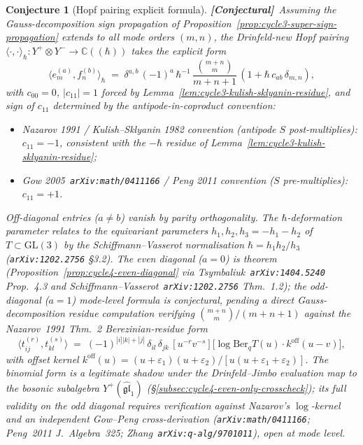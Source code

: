 \documentclass[11pt]{amsart}
\newtheorem{conjecture}[theorem]{Conjecture}
\theoremstyle{definition}
\providecommand{\bC}{\mathbb{C}}
\providecommand{\fgl}{\mathfrak{gl}}
\providecommand{\ClaimStatusConjectured}{\textbf{\textsf{[Conjectural]}}}
\begin{document}
\begin{conjecture}[Hopf pairing explicit formula]
\label{conj:hopf-pairing}
\ClaimStatusConjectured\
Assuming the Gauss-decomposition sign propagation of
Proposition~\ref{prop:cycle3-super-sign-propagation} extends to all mode
orders $(m, n)$, the Drinfeld-new Hopf pairing
$\langle \cdot, \cdot \rangle_\hbar : Y^+ \otimes Y^- \to \bC((\hbar))$
takes the explicit form
\begin{equation}\label{eq:hopf-pairing-formula}
  \langle e^{(a)}_m, f^{(b)}_n \rangle_\hbar
  \;=\; \delta^{a,b}\, (-1)^a\, \hbar^{-1}\,
    \frac{\binom{m+n}{m}}{m+n+1}\,
    (1 + \hbar\, c_{ab}\, \delta_{m,n}),
\end{equation}
with $c_{00} = 0$, $|c_{11}| = 1$ forced by
Lemma~\ref{lem:cycle3-kulish-sklyanin-residue}, and sign of $c_{11}$
determined by the antipode-in-coproduct convention:
\begin{itemize}[leftmargin=2em]
\item \emph{Nazarov 1991 / Kulish--Sklyanin 1982 convention} (antipode
  $S$ post-multiplies): $c_{11} = -1$, consistent with the $-\hbar$
  residue of Lemma~\ref{lem:cycle3-kulish-sklyanin-residue};
\item \emph{Gow 2005~\texttt{arXiv:math/0411166} / Peng 2011 convention}
  ($S$ pre-multiplies): $c_{11} = +1$.
\end{itemize}
Off-diagonal entries ($a \neq b$) vanish by parity orthogonality. The
$\hbar$-deformation parameter relates to the equivariant parameters
$h_1, h_2, h_3 = -h_1 - h_2$ of $T\subset\mathrm{GL}(3)$ by the
Schiffmann--Vasserot normalisation $\hbar = h_1 h_2 / h_3$
(\texttt{arXiv:1202.2756} \S3.2). The even diagonal ($a = 0$) is theorem
(Proposition~\ref{prop:cycle4-even-diagonal} via
Tsymbaliuk~\texttt{arXiv:1404.5240} Prop.~4.3 and
Schiffmann--Vasserot~\texttt{arXiv:1202.2756} Thm.~1.2); the odd-diagonal
($a = 1$) mode-level formula is conjectural, pending a direct
Gauss-decomposition residue computation verifying $\binom{m+n}{m}/(m+n+1)$
against the Nazarov~1991 Thm.~2 Berezinian-residue form
\[
  \langle t^{(r)}_{ij}, t^{(s)}_{kl} \rangle
  \;=\; (-1)^{|i||k| + |j|}\, \delta_{il}\, \delta_{jk}\,
    [u^{-r} v^{-s}]\bigl[\log \mathrm{Ber}_q T(u)\cdot k^{\mathrm{off}}(u-v)\bigr],
\]
with offset kernel $k^{\mathrm{off}}(u) = (u+\varepsilon_1)(u+\varepsilon_2)/
[u(u+\varepsilon_1+\varepsilon_2)]$. The binomial form is a legitimate
shadow under the Drinfeld--Jimbo evaluation map to the bosonic subalgebra
$Y^+(\widehat{\fgl}_1)$ (\S\ref{subsec:cycle4-even-only-crosscheck});
its full validity on the odd diagonal requires verification against
Nazarov's $\log$-kernel and an independent Gow--Peng cross-derivation
(\texttt{arXiv:math/0411166}; Peng~2011 \emph{J.~Algebra}~325;
Zhang~\texttt{arXiv:q-alg/9701011}), open at mode level.
\end{conjecture}
\end{document}
